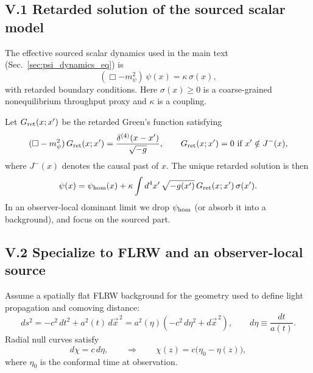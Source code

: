 \documentclass[10pt]{article}
\newcommand{\chis}{\chi}
\begin{document}
\subsection{V.1 Retarded solution of the sourced scalar model}
\label{app:tret_green:formal}

The effective sourced scalar dynamics used in the main text (Sec.~\ref{sec:psi_dynamics_eq}) is
\begin{equation}
(\Box - m_\psi^2)\,\psi(x) = \kappa\,\sigma(x),
\label{eq:V_kg}
\end{equation}
with retarded boundary conditions. Here $\sigma(x)\ge0$ is a coarse-grained nonequilibrium throughput
proxy and $\kappa$ is a coupling.

Let $G_{\rm ret}(x;x')$ be the retarded Green's function satisfying
\begin{equation}
(\Box - m_\psi^2)\,G_{\rm ret}(x;x') = \frac{\delta^{(4)}(x-x')}{\sqrt{-g}},
\qquad
G_{\rm ret}(x;x')=0\ \text{if}\ x'\notin J^-(x),
\label{eq:V_green_def}
\end{equation}
where $J^-(x)$ denotes the causal past of $x$.
The unique retarded solution is then
\begin{equation}
\psi(x) = \psi_{\rm hom}(x) + \kappa \int d^4x'\,\sqrt{-g(x')}\,G_{\rm ret}(x;x')\,\sigma(x').
\label{eq:V_formal_solution}
\end{equation}
In an observer-local dominant limit we drop $\psi_{\rm hom}$ (or absorb it into a background),
and focus on the sourced part.

\subsection{V.2 Specialize to FLRW and an observer-local source}
\label{app:tret_green:flrw_source}

Assume a spatially flat FLRW background for the geometry used to define light propagation and
comoving distance:
\begin{equation}
ds^2 = -c^2\,dt^2 + a^2(t)\,d\vec x^{\,2}
= a^2(\eta)\left(-c^2\,d\eta^2 + d\vec x^{\,2}\right),
\qquad
d\eta \equiv \frac{dt}{a(t)}.
\label{eq:V_flrw_metric}
\end{equation}
Radial null curves satisfy
\begin{equation}
d\chis = c\,d\eta,
\qquad\Rightarrow\qquad
\chis(z)=c\bigl(\eta_0-\eta(z)\bigr),
\label{eq:V_null_chi_eta}
\end{equation}
where $\eta_0$ is the conformal time at observation.
\end{document}
